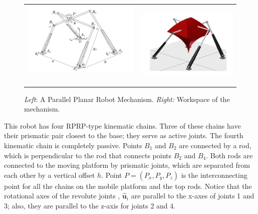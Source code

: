 \begin{figure}[tbph!]
	\centering
	\begin{tabular}{@{}c@{}c@{}}
		\includegraphics[width=0.50\linewidth ,height=0.4\columnwidth]{../lec_notes/figures/parallel_translational.png} \,\,
		&
		\includegraphics[width=0.48\columnwidth,height=0.4\columnwidth]{../lec_notes/figures/parallel_translational_workspace.png}
	\end{tabular}
	\caption{\textit{Left}: A Parallel Planar Robot Mechanism. \textit{Right:} Workspace of the mechanism.}
	\label{fig:para_mech}
\end{figure}

This robot has four RPRP-type kinematic chains. Three of these chains have their prismatic pair closest to the base; they serve as active joints. The fourth kinematic chain is completely passive. Points $B_1$ and $B_2$ are connected by a rod, which is perpendicular to the rod that connects points $B_2$ and $B_4$. Both rods are connected to the moving platform by prismatic joints, which are separated from each other by a vertical offset $h$. Point $P = (P_x,P_y, P_z)$ is the interconnecting point for all the chains on the mobile platform and the top rods. Notice that the rotational axes of the revolute joints \ie, $\bm{\hat{u}}_i$ are parallel to the x-axes of joints 1 and 3; also, they are parallel to the z-axis for joints 2 and 4. 

